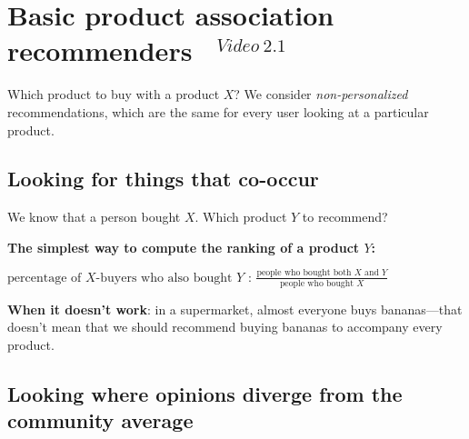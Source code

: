 \documentclass[11pt]{article}
\begin{document}



\section{Basic product association recommenders ~$^{Video~2.1}$}

Which product to buy with a product $X$? 
We consider \emph{non-personalized} recommendations,
which are the same for every user looking at a particular product.

\subsection{Looking for things that co-occur}

We know that a person bought $X$. Which product $Y$ to recommend?

\textbf{The simplest way to compute the ranking of a product $Y$:}


$\text{percentage of $X$-buyers who also bought $Y$ : }\frac{\text{people who bought both $X$ and $Y$}}{\text{people who bought $X$}}$

\textbf{When it doesn't work}: in a supermarket, almost everyone buys bananas---that doesn't mean that we should recommend buying bananas to accompany every product.

\subsection{Looking where opinions diverge from the community average}
\end{document}
